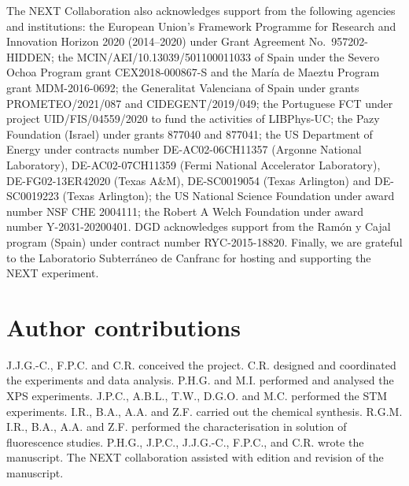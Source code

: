 \documentclass[aps,prl,reprint,longbibliography,superscriptaddress, english]{revtex4-1}
\begin{document}
The NEXT Collaboration also acknowledges support from the following agencies and institutions: the European Union's Framework Programme for Research and Innovation Horizon 2020 (2014--2020) under Grant Agreement No.\ 957202-HIDDEN; the MCIN/AEI/10.13039/501100011033 of Spain under the Severo Ochoa Program grant CEX2018-000867-S and the Mar\'ia de Maeztu Program grant MDM-2016-0692; the Generalitat Valenciana of Spain under grants PROMETEO/2021/087 and CIDEGENT/2019/049; the Portuguese FCT under project UID/FIS/04559/2020 to fund the activities of LIBPhys-UC; the Pazy Foundation (Israel) under grants 877040 and 877041; the US Department of Energy under contracts number DE-AC02-06CH11357 (Argonne National Laboratory), DE-AC02-07CH11359 (Fermi National Accelerator Laboratory), DE-FG02-13ER42020 (Texas A\&M), DE-SC0019054 (Texas Arlington) and DE-SC0019223 (Texas Arlington); the US National Science Foundation under award number NSF CHE 2004111; the Robert A Welch Foundation under award number Y-2031-20200401. DGD acknowledges support from the Ram\'on y Cajal program (Spain) under contract number RYC-2015-18820. Finally, we are grateful to the Laboratorio Subterr\'aneo de Canfranc for hosting and supporting the NEXT experiment.


\section{Author contributions}
J.J.G.-C., F.P.C. and C.R. conceived the project. C.R. designed and coordinated the experiments and data analysis. P.H.G. and M.I. performed and analysed the XPS experiments. J.P.C., A.B.L., T.W., D.G.O. and M.C. performed the STM experiments. I.R., B.A., A.A. and Z.F. carried out the chemical synthesis. R.G.M. I.R., B.A., A.A. and Z.F. performed the characterisation in solution of fluorescence studies. P.H.G., J.P.C., J.J.G.-C., F.P.C., and C.R. wrote the manuscript. The NEXT collaboration assisted with edition and revision of the manuscript. 

 

\end{document}
